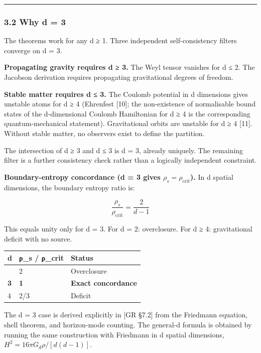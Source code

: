 \documentclass[
]{article}
\begin{document}
\begin{center}\rule{0.5\linewidth}{0.5pt}\end{center}

\hypertarget{why-d-3}{%
\subsubsection{3.2 Why d = 3}\label{why-d-3}}

The theorems work for any d ≥ 1. Three independent self-consistency
filters converge on d = 3.

\textbf{Propagating gravity requires d ≥ 3.} The Weyl tensor vanishes
for d ≤ 2. The Jacobson derivation requires propagating gravitational
degrees of freedom.

\textbf{Stable matter requires d ≤ 3.} The Coulomb potential in d
dimensions gives unstable atoms for d ≥ 4 (Ehrenfest {[}10{]}; the
non-existence of normalisable bound states of the d-dimensional Coulomb
Hamiltonian for d ≥ 4 is the corresponding quantum-mechanical
statement). Gravitational orbits are unstable for d ≥ 4 {[}11{]}.
Without stable matter, no observers exist to define the partition.

The intersection of d ≥ 3 and d ≤ 3 is d = 3, already uniquely. The
remaining filter is a further consistency check rather than a logically
independent constraint.

\textbf{Boundary-entropy concordance (d = 3 gives
\(\rho_s = \rho_{\text{crit}}\)).} In d spatial dimensions, the boundary
entropy ratio is:

\[\frac{\rho_s}{\rho_{\text{crit}}} = \frac{2}{d-1}\]

This equals unity only for d = 3. For d = 2: overclosure. For d ≥ 4:
gravitational deficit with no source.

\begin{longtable}[]{@{}lll@{}}
\toprule\noalign{}
d & ρ\_s / ρ\_crit & Status \\
\midrule\noalign{}
\endhead
\bottomrule\noalign{}
\endlastfoot
2 & 2 & Overclosure \\
\textbf{3} & \textbf{1} & \textbf{Exact concordance} \\
4 & 2/3 & Deficit \\
\end{longtable}

The d = 3 case is derived explicitly in {[}GR §7.2{]} from the Friedmann
equation, shell theorem, and horizon-mode counting. The general-d
formula is obtained by running the same construction with Friedmann in d
spatial dimensions, \(H^2 = 16\pi G_d \rho / [d(d-1)]\).
\end{document}
